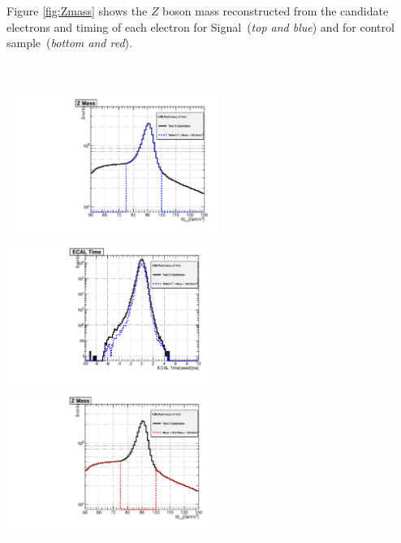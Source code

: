 \paragraph*{}\mbox{}\\
Figure \ref{fig:Zmass} shows the $Z$ boson mass reconstructed from the candidate electrons and timing of each electron for Signal~(\textit{top and blue}) and for control sample~(\textit{bottom and red}).

\paragraph*{}\mbox{}\\
\begin{minipage}{\linewidth} 
\begin{center}
\centering
\mbox{
\includegraphics[height=0.55\textwidth, width=0.5\textwidth]{THESISPLOTS/Z-CandidateOverLay-SignalMass.pdf}
\includegraphics[height=0.55\textwidth, width=0.5\textwidth]{THESISPLOTS/Z-CandidateOverLay-SignalTime.pdf}}
\mbox{
\includegraphics[height=0.55\textwidth, width=0.5\textwidth]{THESISPLOTS/Z-CandidateOverLay-BackgroundMass.pdf}
}
\end{center}
\end{minipage}
